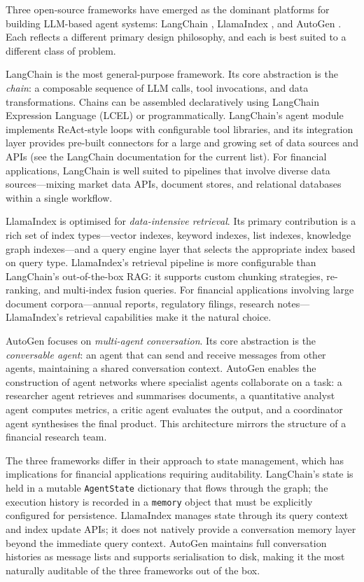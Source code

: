 \begin{deepdive}
Three open-source frameworks have emerged as the dominant platforms for building
LLM-based agent systems: LangChain \cite{langchain2022}, LlamaIndex \cite{llamaindex2022},
and AutoGen \cite{wu2023autogen}. Each reflects a different primary design philosophy,
and each is best suited to a different class of problem.

LangChain \cite{langchain2022} is the most general-purpose framework. Its core
abstraction is the \emph{chain}: a composable sequence of LLM calls, tool invocations,
and data transformations. Chains can be assembled declaratively using LangChain
Expression Language (LCEL) or programmatically. LangChain's agent module implements
ReAct-style loops with configurable tool libraries, and its integration layer provides
pre-built connectors for a large and growing set of data sources and APIs (see the LangChain documentation for the current list). For financial applications,
LangChain is well suited to pipelines that involve diverse data sources---mixing market
data APIs, document stores, and relational databases within a single workflow.

LlamaIndex \cite{llamaindex2022} is optimised for \emph{data-intensive retrieval}.
Its primary contribution is a rich set of index types---vector indexes, keyword indexes,
list indexes, knowledge graph indexes---and a query engine layer that selects the
appropriate index based on query type. LlamaIndex's retrieval pipeline is more
configurable than LangChain's out-of-the-box RAG: it supports custom chunking
strategies, re-ranking, and multi-index fusion queries. For financial applications
involving large document corpora---annual reports, regulatory filings, research notes---
LlamaIndex's retrieval capabilities make it the natural choice.

AutoGen \cite{wu2023autogen} focuses on \emph{multi-agent conversation}. Its core
abstraction is the \emph{conversable agent}: an agent that can send and receive messages
from other agents, maintaining a shared conversation context. AutoGen enables the
construction of agent networks where specialist agents collaborate on a task: a
researcher agent retrieves and summarises documents, a quantitative analyst agent
computes metrics, a critic agent evaluates the output, and a coordinator agent
synthesises the final product. This architecture mirrors the structure of a
financial research team.

The three frameworks differ in their approach to state management, which has
implications for financial applications requiring auditability. LangChain's state is
held in a mutable \texttt{AgentState} dictionary that flows through the graph; the
execution history is recorded in a \texttt{memory} object that must be explicitly
configured for persistence. LlamaIndex manages state through its query context and
index update APIs; it does not natively provide a conversation memory layer beyond
the immediate query context. AutoGen maintains full conversation histories as message
lists and supports serialisation to disk, making it the most naturally auditable of
the three frameworks out of the box.


\end{deepdive}
